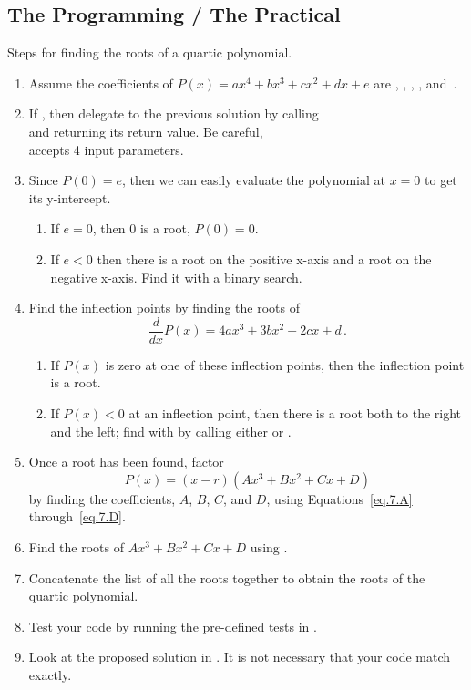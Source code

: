 \subsection{The Programming / The Practical}

Steps for finding the roots of a quartic polynomial.

\begin{enumerate}
\item Assume the coefficients of $P(x) = a x^4 + b x^3 + c x^2 + d x + e$ are
  ,  ,  ,  , and~.
\item If , then delegate to the previous solution by
  calling \\
   and returning its return
  value.  Be careful, \\
   accepts 4 input
  parameters.
\item Since $P(0) = e$, then we can easily evaluate the polynomial at
  $x=0$ to get its y-intercept.
  \begin{enumerate}
  \item If $e = 0$, then 0 is a root, $P(0) = 0$.
  \item If $e<0$ then there is a root on the positive x-axis and a
    root on the negative x-axis.  Find it with a binary search.
  \end{enumerate}
\item Find the inflection points by finding the roots
  of \[\frac{d}{dx} P(x) = 4 a x^3 + 3 b x^2 + 2 c x + d\,.\]
  \begin{enumerate}
  \item If $P(x)$ is zero at one of these inflection points, then the
    inflection point is a root.
  \item If $P(x) < 0$ at an inflection point, then there is a root
    both to the right and the left; find with by calling either
     or .
  \end{enumerate}
\item Once a root has been found, factor \[P(x) = (x-r)(Ax^3 + Bx^2 +
  Cx + D)\] by finding the coefficients, $A$, $B$, $C$, and $D$, using
  Equations~\eqref{eq.7.A} through~\eqref{eq.7.D}.
\item Find the roots of $Ax^3 + Bx^2 + Cx + D$ using
  .
  \item Concatenate the list of all the roots together to obtain the
    roots of the quartic polynomial.

\item Test your code by running the pre-defined tests in
  .

\item Look at the proposed solution in .
  It is not necessary that your code match exactly.

\end{enumerate}
